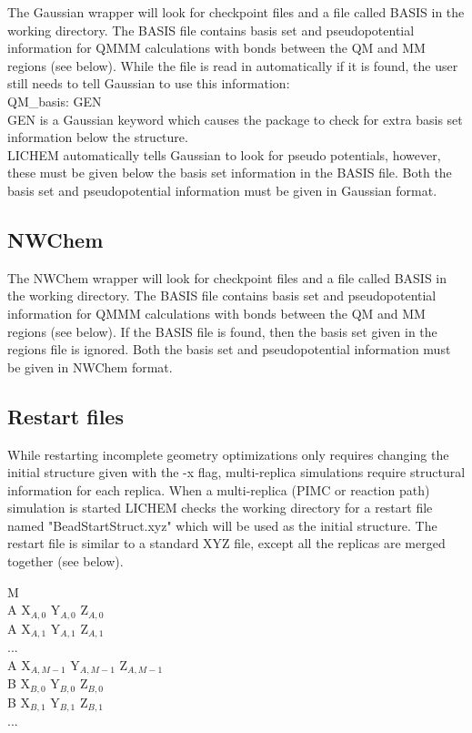 \documentclass[12pt]{report}
\begin{document}
The Gaussian wrapper will look for checkpoint files and a file called BASIS in
the working directory. The BASIS file contains basis set and pseudopotential
information for QMMM calculations with bonds between the QM and MM regions
(see below). While the file is read in automatically if it is found, the user
still needs to tell Gaussian to use this information: \\

QM\_basis: GEN \\

GEN is a Gaussian keyword which causes the package to check for extra basis
set information below the structure. \\

LICHEM automatically tells Gaussian to look for pseudo potentials, however,
these must be given below the basis set information in the BASIS file. Both
the basis set and pseudopotential information must be given in Gaussian
format.

\subsection{NWChem}

The NWChem wrapper will look for checkpoint files and a file called BASIS in
the working directory. The BASIS file contains basis set and pseudopotential
information for QMMM calculations with bonds between the QM and MM regions
(see below). If the BASIS file is found, then the basis set given in the
regions file is ignored. Both the basis set and pseudopotential information
must be given in NWChem format.

\subsection{Restart files}

While restarting incomplete geometry optimizations only requires changing
the initial structure given with the -x flag, multi-replica simulations
require structural information for each replica. When a multi-replica
(PIMC or reaction path) simulation is started LICHEM checks the working
directory for a restart file named "BeadStartStruct.xyz" which will be used as
the initial structure. The restart file is similar to a standard XYZ file,
except all the replicas are merged together (see below).

M \\

A  X$_{A,0}$  Y$_{A,0}$  Z$_{A,0}$ \\
A  X$_{A,1}$  Y$_{A,1}$  Z$_{A,1}$ \\
... \\
A  X$_{A,M-1}$  Y$_{A,M-1}$  Z$_{A,M-1}$ \\
B  X$_{B,0}$  Y$_{B,0}$  Z$_{B,0}$ \\
B  X$_{B,1}$  Y$_{B,1}$  Z$_{B,1}$ \\
... \\
\end{document}
